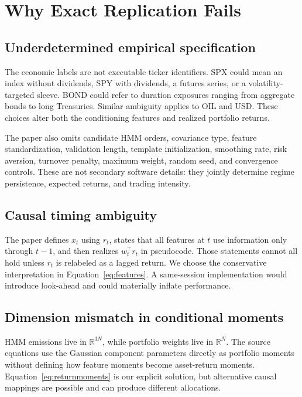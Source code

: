 \documentclass[11pt]{article}
\begin{document}
\section{Why Exact Replication Fails}

\subsection{Underdetermined empirical specification}

The economic labels are not executable ticker identifiers. SPX could mean an index without dividends, SPY with dividends, a futures series, or a volatility-targeted sleeve. BOND could refer to duration exposures ranging from aggregate bonds to long Treasuries. Similar ambiguity applies to OIL and USD. These choices alter both the conditioning features and realized portfolio returns.

The paper also omits candidate HMM orders, covariance type, feature standardization, validation length, template initialization, smoothing rate, risk aversion, turnover penalty, maximum weight, random seed, and convergence controls. These are not secondary software details: they jointly determine regime persistence, expected returns, and trading intensity.

\subsection{Causal timing ambiguity}

The paper defines \(x_t\) using \(r_t\), states that all features at \(t\) use information only through \(t-1\), and then realizes \(w_t^\top r_t\) in pseudocode. Those statements cannot all hold unless \(r_t\) is relabeled as a lagged return. We choose the conservative interpretation in Equation~\eqref{eq:features}. A same-session implementation would introduce look-ahead and could materially inflate performance.

\subsection{Dimension mismatch in conditional moments}

HMM emissions live in \(\mathbb{R}^{3N}\), while portfolio weights live in \(\mathbb{R}^{N}\). The source equations use the Gaussian component parameters directly as portfolio moments without defining how feature moments become asset-return moments. Equation~\eqref{eq:returnmoments} is our explicit solution, but alternative causal mappings are possible and can produce different allocations.
\end{document}
